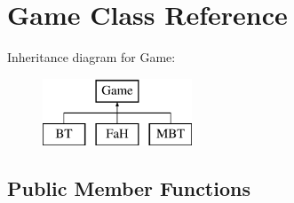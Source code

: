\hypertarget{class_game}{}\section{Game Class Reference}
\label{class_game}
Inheritance diagram for Game\+:\begin{figure}[H]
\begin{center}
\leavevmode
\includegraphics[height=2.000000cm]{class_game}
\end{center}
\end{figure}
\subsection*{Public Member Functions}
